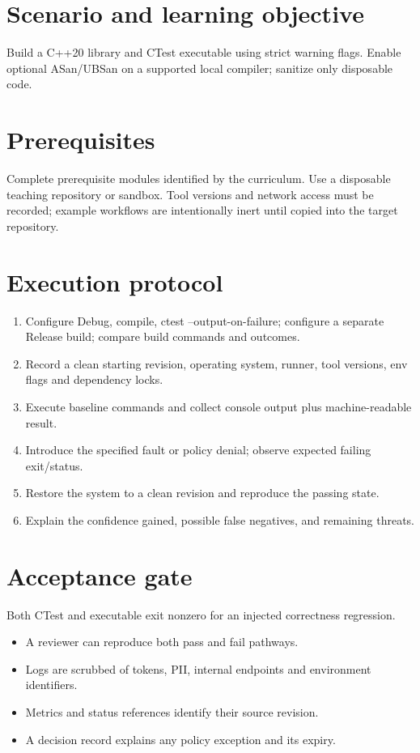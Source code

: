 \documentclass[11pt,letterpaper]{article}
\begin{document}
\makedoctitle
\makedocsummary
\tableofcontents
\clearpage
\section{Scenario and learning objective}
Build a C++20 library and CTest executable using strict warning flags. Enable optional ASan/UBSan on a supported local compiler; sanitize only disposable code.

\section{Prerequisites}
Complete prerequisite modules identified by the curriculum. Use a disposable teaching repository or sandbox. Tool versions and network access must be recorded; example workflows are intentionally inert until copied into the target repository.

\section{Execution protocol}
\begin{enumerate}
\item Configure Debug, compile, ctest --output-on-failure; configure a separate Release build; compare build commands and outcomes.
\item Record a clean starting revision, operating system, runner, tool versions, env flags and dependency locks.
\item Execute baseline commands and collect console output plus machine-readable result.
\item Introduce the specified fault or policy denial; observe expected failing exit/status.
\item Restore the system to a clean revision and reproduce the passing state.
\item Explain the confidence gained, possible false negatives, and remaining threats.
\end{enumerate}
\section{Acceptance gate}
Both CTest and executable exit nonzero for an injected correctness regression.

\begin{itemize}
\item A reviewer can reproduce both pass and fail pathways.
\item Logs are scrubbed of tokens, PII, internal endpoints and environment identifiers.
\item Metrics and status references identify their source revision.
\item A decision record explains any policy exception and its expiry.
\end{itemize}
\end{document}
